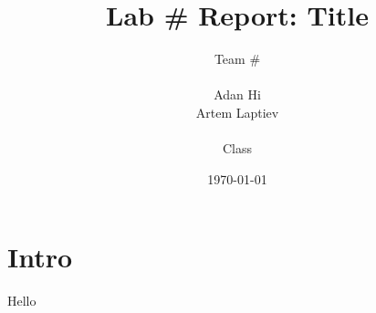 \documentclass{lab}
\title{Lab \# Report: Title} %
\author{Team \# \\\\ Adan Hi \\ Artem Laptiev \\\\ Class} %
\date{\today} %
\begin{document}
\maketitle

\newpage

\section{Intro}

Hello
\end{document}

